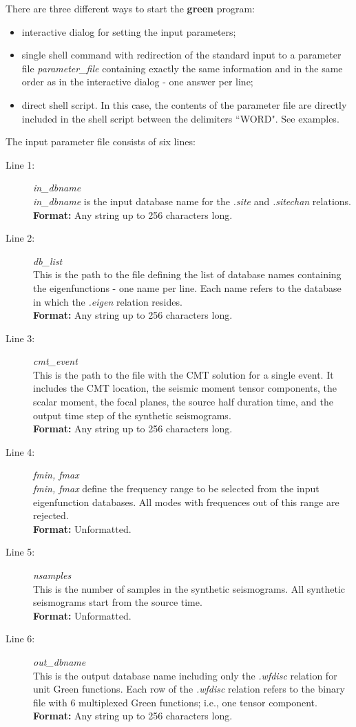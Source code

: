 \noindent There are three different ways to start the {\bf green} program:
\begin{itemize}
\item interactive dialog for setting the input parameters;
\item single shell command with redirection of the standard input to a parameter
file {\it parameter\_file} containing exactly the same information and
in the same order as in the interactive dialog - one answer per line;
\item direct shell script. In this case, the contents of the parameter file are
directly included in the shell script between the delimiters ``WORD". See examples.
\end{itemize}
\noindent The input parameter file consists of six lines:
\begin{description}
\item[Line 1:] {\it in\_dbname } \\
{\it in\_dbname } is the input database name for the {\it .site} and {\it .sitechan} relations. \\
  {\bf Format:} Any string up to 256 characters long.
\item[Line 2:] {\it db\_list} \\
  This is the path to the file defining  the list of database names containing
the eigenfunctions - one
  name per line. 
  Each name refers to the database in which the {\it .eigen} relation resides. \\
  {\bf Format:} Any string up to 256 characters long.
\item[Line 3:] {\it cmt\_event}\\
  This is the path to the file with the CMT solution for a single event. It includes 
  the CMT location, the seismic moment tensor components, the scalar moment, the focal 
  planes, the source half duration time, and the output time step of the synthetic 
  seismograms. \\
  {\bf Format:} Any string up to 256 characters long.
\item[Line 4:] {\it fmin, fmax} \\
  {\it fmin, fmax} define the frequency range to be selected from the input
  eigenfunction databases. All modes with frequences out of this range are 
  rejected. \\
  {\bf Format:} Unformatted.
\item[Line 5:] {\it nsamples} \\
  This is the number of samples in the synthetic seismograms. All synthetic 
  seismograms start from the source time. \\
  {\bf Format:} Unformatted.
\item[Line 6:] {\it out\_dbname} \\
  This is the output database name including only the {\it .wfdisc} relation for 
  unit Green functions. Each row of the {\it .wfdisc} relation refers to the binary 
  file with 6 multiplexed Green functions; i.e., one tensor component. \\
  {\bf Format:} Any string up to 256 characters long.
\end{description}
%
%

